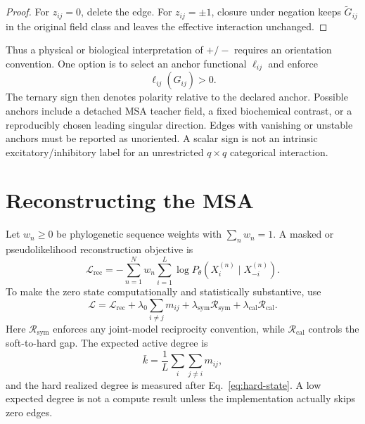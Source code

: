\documentclass[10pt,twocolumn]{article}
\newcommand{\1}{\mathbf 1}
\theoremstyle{remark}
\begin{document}
\begin{proof}
For $z_{ij}=0$, delete the edge.  For $z_{ij}=\pm1$, closure under negation keeps
$\widetilde G_{ij}$ in the original field class and leaves the effective interaction unchanged.
\end{proof}

Thus a physical or biological interpretation of $+/-$ requires an orientation convention.  One
option is to select an anchor functional $\ell_{ij}$ and enforce
\begin{equation}
\ell_{ij}(\widehat G_{ij})>0.
\label{eq:orientation}
\end{equation}
The ternary sign then denotes polarity relative to the declared anchor.  Possible anchors include
a detached MSA teacher field, a fixed biochemical contrast, or a reproducibly chosen leading
singular direction.  Edges with vanishing or unstable anchors must be reported as unoriented.  A
scalar sign is not an intrinsic excitatory/inhibitory label for an unrestricted $q\times q$
categorical interaction.

\section{Reconstructing the MSA}

Let $w_n\geq0$ be phylogenetic sequence weights with $\sum_nw_n=1$.  A masked or
pseudolikelihood reconstruction objective is
\begin{equation}
\mathcal L_{\mathrm{rec}}
=-\sum_{n=1}^{N}w_n\sum_{i=1}^{L}
\log P_\theta(X_i^{(n)}\mid X_{-i}^{(n)}).
\label{eq:reconstruction-loss}
\end{equation}
To make the zero state computationally and statistically substantive, use
\begin{equation}
\mathcal L
=\mathcal L_{\mathrm{rec}}
+\lambda_0\sum_{i\ne j}m_{ij}
+\lambda_{\mathrm{sym}}\mathcal R_{\mathrm{sym}}
+\lambda_{\mathrm{cal}}\mathcal R_{\mathrm{cal}}.
\label{eq:total-loss}
\end{equation}
Here $\mathcal R_{\mathrm{sym}}$ enforces any joint-model reciprocity convention, while
$\mathcal R_{\mathrm{cal}}$ controls the soft-to-hard gap.  The expected active degree is
\begin{equation}
\bar k=\frac{1}{L}\sum_i\sum_{j\ne i}m_{ij},
\label{eq:expected-degree}
\end{equation}
and the hard realized degree is measured after Eq.~\ref{eq:hard-state}.  A low expected degree is
not a compute result unless the implementation actually skips zero edges.
\end{document}
